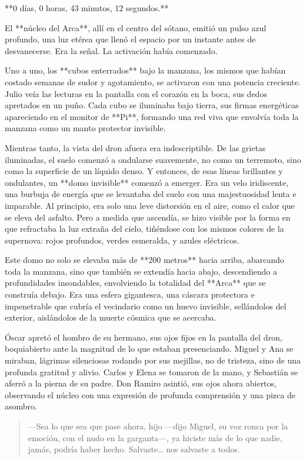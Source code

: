 \documentclass[a4paper,12pt]{book}
\begin{document}
**0 días, 0 horas, 43 minutos, 12 segundos.**

El **núcleo del Arca**, allí en el centro del sótano, emitió un pulso azul profundo, una luz etérea que llenó el espacio por un instante antes de desvanecerse. Era la señal. La activación había comenzado.

Uno a uno, los **cubos enterrados** bajo la manzana, los mismos que habían costado semanas de sudor y agotamiento, se activaron con una potencia creciente. Julio veía las lecturas en la pantalla con el corazón en la boca, sus dedos apretados en un puño. Cada cubo se iluminaba bajo tierra, sus firmas energéticas apareciendo en el monitor de **Pi**, formando una red viva que envolvía toda la manzana como un manto protector invisible.

Mientras tanto, la vista del dron afuera era indescriptible. De las grietas iluminadas, el suelo comenzó a ondularse suavemente, no como un terremoto, sino como la superficie de un líquido denso. Y entonces, de esas líneas brillantes y ondulantes, un **domo invisible** comenzó a emerger. Era un velo iridiscente, una burbuja de energía que se levantaba del suelo con una majestuosidad lenta e imparable. Al principio, era solo una leve distorsión en el aire, como el calor que se eleva del asfalto. Pero a medida que ascendía, se hizo visible por la forma en que refractaba la luz extraña del cielo, tiñéndose con los mismos colores de la supernova: rojos profundos, verdes esmeralda, y azules eléctricos.

Este domo no solo se elevaba más de **200 metros** hacia arriba, abarcando toda la manzana, sino que también se extendía hacia abajo, descendiendo a profundidades insondables, envolviendo la totalidad del **Arca** que se construía debajo. Era una esfera gigantesca, una cáscara protectora e impenetrable que cubría el vecindario como un huevo invisible, sellándolos del exterior, aislándolos de la muerte cósmica que se acercaba.

Óscar apretó el hombro de su hermano, sus ojos fijos en la pantalla del dron, boquiabierto ante la magnitud de lo que estaban presenciando. Miguel y Ana se miraban, lágrimas silenciosas rodando por sus mejillas, no de tristeza, sino de una profunda gratitud y alivio. Carlos y Elena se tomaron de la mano, y Sebastián se aferró a la pierna de su padre. Don Ramiro asintió, sus ojos ahora abiertos, observando el núcleo con una expresión de profunda comprensión y una pizca de asombro.

\begin{quote}
    —Sea lo que sea que pase ahora, hijo —dijo Miguel, su voz ronca por la emoción, con el nudo en la garganta—, ya hiciste más de lo que nadie, jamás, podría haber hecho. Salvaste… nos salvaste a todos.
\end{quote}
\end{document}
